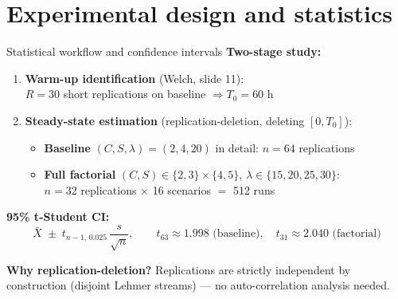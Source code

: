 \documentclass[10pt,aspectratio=169]{beamer}
\begin{document}
\section{Experimental design and statistics}
\begin{frame}{Statistical workflow and confidence intervals}
\textbf{Two-stage study:}
\begin{enumerate}
\item \textbf{Warm-up identification} (Welch, slide 11): \\
      $R = 30$ short replications on baseline $\Rightarrow T_0 = 60$ h
\item \textbf{Steady-state estimation} (replication-deletion, deleting $[0,T_0]$):
   \begin{itemize}
     \item \textbf{Baseline} $(C,S,\lambda)=(2,4,20)$ in detail: \alert{$n = 64$} replications
     \item \textbf{Full factorial} $(C,S)\in\{2,3\}\times\{4,5\}$, $\lambda\in\{15,20,25,30\}$:\\
           \alert{$n = 32$} replications $\times$ 16 scenarios $=$ 512 runs
   \end{itemize}
\end{enumerate}

\vspace{0.3cm}
\textbf{95\% t-Student CI:}
\[
\bar X \;\pm\; t_{n-1,\,0.025}\,\frac{s}{\sqrt n}, \qquad
t_{63} \approx 1.998 \text{ (baseline)}, \quad
t_{31} \approx 2.040 \text{ (factorial)}
\]

\vspace{0.3cm}
\textbf{Why replication-deletion?} Replications are \alert{strictly independent} by construction
(disjoint Lehmer streams) — no auto-correlation analysis needed.
\end{frame}

\end{document}
